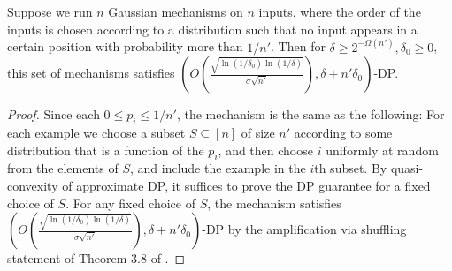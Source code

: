 \begin{lem}\label{lem:approximateshuffle}
Suppose we run $n$ Gaussian mechanisms on $n$ inputs, where the order of the inputs is chosen according to a distribution such that no input appears in a certain position with probability more than $1/n'$. Then for $\delta \geq 2^{-\Omega(n')}, \delta_0 \geq 0$, this set of mechanisms satisfies $\left(O\left(\frac{\sqrt{ \ln (1/\delta_0) \ln(1/\delta)}}{\sigma \sqrt{n'}}\right), \delta + n' \delta_0\right)$-DP.
\end{lem}
\begin{proof}
Since each $0 \leq p_i \leq 1/n'$, the mechanism is the same as the following: For each example we choose a subset $S \subseteq [n]$ of size $n'$ according to some distribution that is a function of the $p_i$, and then choose $i$ uniformly at random from the elements of $S$, and include the example in the $i$th subset. By quasi-convexity of approximate DP, it suffices to prove the DP guarantee for a fixed choice of $S$. For any fixed choice of $S$, the mechanism satisfies $\left(O\left(\frac{\sqrt{ \ln (1/\delta_0) \ln(1/\delta)}}{\sigma \sqrt{n'}}\right), \delta + n' \delta_0\right)$-DP by the amplification via shuffling statement of Theorem 3.8 of \cite{HidingAmongTheClones}.
\end{proof}

